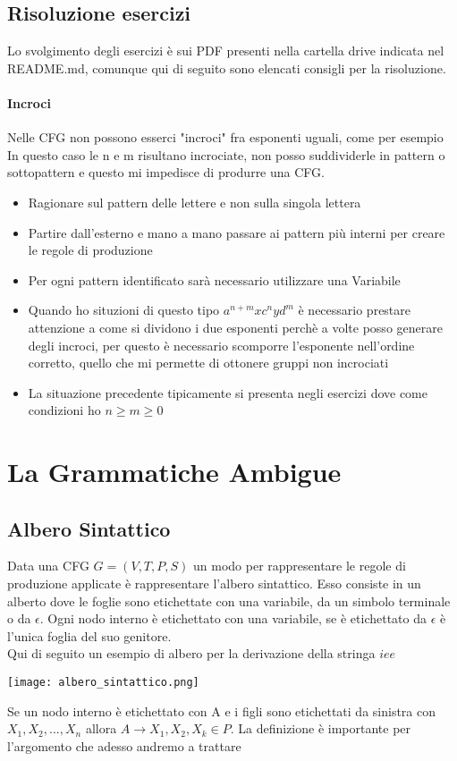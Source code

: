 \subsection*{Risoluzione esercizi}
Lo svolgimento degli esercizi è sui PDF presenti nella cartella drive indicata nel README.md, comunque
qui di seguito sono elencati consigli per la risoluzione.
\paragraph*{Incroci} Nelle CFG non possono esserci "incroci" fra esponenti uguali, come per esempio
 In questo caso le n e m risultano incrociate, non posso suddividerle in pattern o
sottopattern e questo mi impedisce di produrre una CFG.
\begin{itemize}
    \item Ragionare sul pattern delle lettere e non sulla singola lettera
    \item Partire dall'esterno e mano a mano passare ai pattern più interni per creare le regole di produzione
    \item Per ogni pattern identificato sarà necessario utilizzare una Variabile
    \item Quando ho situzioni di questo tipo $a^{n+m}xc^n y d^m$ è necessario prestare attenzione a
    come si dividono i due esponenti perchè a volte posso generare degli incroci, per questo è necessario
    scomporre l'esponente nell'ordine corretto, quello che mi permette di ottonere gruppi non incrociati
    \item La situazione precedente tipicamente si presenta negli esercizi dove come condizioni ho $n \geq m \geq 0$
\end{itemize}

\section{La Grammatiche Ambigue}
\subsection{Albero Sintattico}
Data una CFG $G= (V,T,P,S)$ un modo per rappresentare le regole di produzione applicate è rappresentare l'albero sintattico.
Esso consiste in un alberto dove le foglie sono etichettate con una variabile, da un simbolo
terminale o da $\epsilon$. Ogni nodo interno è etichettato con una variabile, 
se è etichettato da $\epsilon$ è l'unica foglia del suo genitore.
\\ Qui di seguito un esempio di albero per la derivazione della stringa $iee$
\begin{center}
    \texttt{[image: albero\_sintattico.png]}
\end{center}
Se un nodo interno è etichettato con A e i figli sono etichettati da sinistra
con $X_1, X_2, ..., X_n$ allora $A \rightarrow X_1, X_2, X_k \in P$.
La definizione è importante per l'argomento che adesso andremo a trattare
